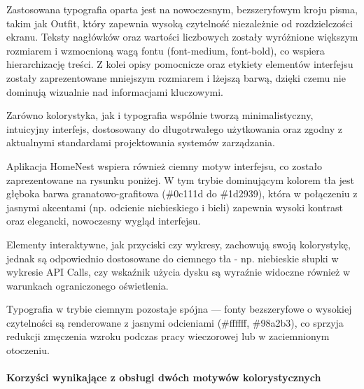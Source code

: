 Zastosowana typografia oparta jest na nowoczesnym, bezszeryfowym kroju pisma, takim jak Outfit, który zapewnia wysoką czytelność niezależnie od rozdzielczości ekranu. Teksty nagłówków oraz wartości liczbowych zostały wyróżnione większym rozmiarem i wzmocnioną wagą fontu (font-medium, font-bold), co wspiera hierarchizację treści. Z kolei opisy pomocnicze oraz etykiety elementów interfejsu zostały zaprezentowane mniejszym rozmiarem i lżejszą barwą, dzięki czemu nie dominują wizualnie nad informacjami kluczowymi.

Zarówno kolorystyka, jak i typografia wspólnie tworzą minimalistyczny, intuicyjny interfejs, dostosowany do długotrwałego użytkowania oraz zgodny z aktualnymi standardami projektowania systemów zarządzania.

Aplikacja HomeNest wspiera również ciemny motyw interfejsu, co zostało zaprezentowane na rysunku poniżej. W tym trybie dominującym kolorem tła jest głęboka barwa granatowo-grafitowa (\#0c111d do \#1d2939), która w połączeniu z jasnymi akcentami (np. odcienie niebieskiego i bieli) zapewnia wysoki kontrast oraz elegancki, nowoczesny wygląd interfejsu.

Elementy interaktywne, jak przyciski czy wykresy, zachowują swoją kolorystykę, jednak są odpowiednio dostosowane do ciemnego tła - np. niebieskie słupki w wykresie API Calls, czy wskaźnik użycia dysku są wyraźnie widoczne również w warunkach ograniczonego oświetlenia.

Typografia w trybie ciemnym pozostaje spójna — fonty bezszeryfowe o wysokiej czytelności są renderowane z jasnymi odcieniami (\#ffffff, \#98a2b3), co sprzyja redukcji zmęczenia wzroku podczas pracy wieczorowej lub w zaciemnionym otoczeniu.

\paragraph{Korzyści wynikające z obsługi dwóch motywów kolorystycznych}\mbox{}\\

